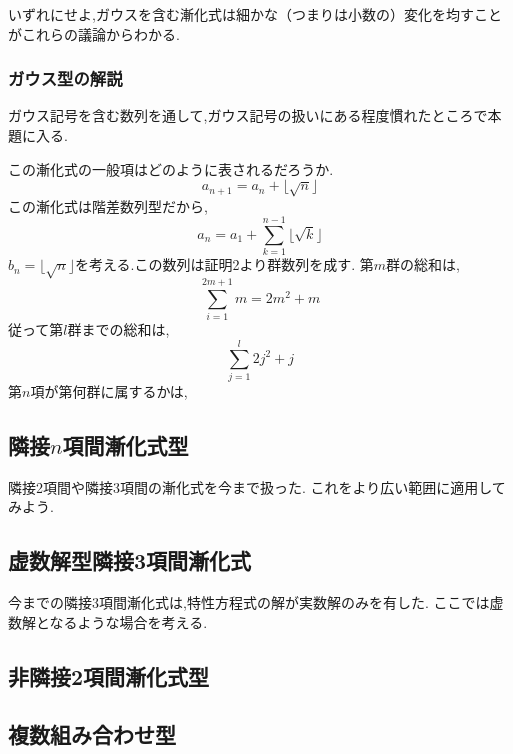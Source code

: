 いずれにせよ,ガウスを含む漸化式は細かな（つまりは小数の）変化を均すことがこれらの議論からわかる.
\subsubsection{ガウス型の解説}
ガウス記号を含む数列を通して,ガウス記号の扱いにある程度慣れたところで本題に入る.

この漸化式の一般項はどのように表されるだろうか.
\[
  a_{n+1}=a_n+\lfloor \sqrt{n} \rfloor
\]
この漸化式は階差数列型だから,
\[
  a_n=a_1+\sum_{k=1}^{n-1} \lfloor \sqrt{k} \rfloor
\]
$b_n=\lfloor \sqrt{n} \rfloor$を考える.この数列は証明2より群数列を成す.
第$m$群の総和は,
\[
  \sum_{i=1}^{2m+1} m=2m^2+m
\]
従って第$l$群までの総和は,
\[
  \sum_{j=1}^{l}  2j^2+j
\]
第$n$項が第何群に属するかは,
\subsection{隣接$n$項間漸化式型}
隣接2項間や隣接3項間の漸化式を今まで扱った.
これをより広い範囲に適用してみよう.

\subsection{虚数解型隣接3項間漸化式}
今までの隣接3項間漸化式は,特性方程式の解が実数解のみを有した.
ここでは虚数解となるような場合を考える.
\subsection{非隣接2項間漸化式型}
\subsection{複数組み合わせ型}
